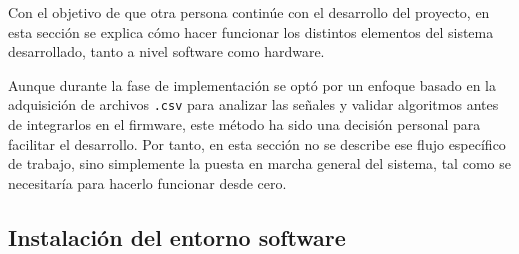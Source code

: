 Con el objetivo de que otra persona continúe con el desarrollo del proyecto, en esta sección se explica cómo hacer funcionar los distintos elementos del sistema desarrollado, tanto a nivel software como hardware.

Aunque durante la fase de implementación se optó por un enfoque basado en la adquisición de archivos \texttt{.csv} para analizar las señales y validar algoritmos antes de integrarlos en el firmware, este método ha sido una decisión personal para facilitar el desarrollo. Por tanto, en esta sección no se describe ese flujo específico de trabajo, sino simplemente la puesta en marcha general del sistema, tal como se necesitaría para hacerlo funcionar desde cero.


\subsection{Instalación del entorno software}

